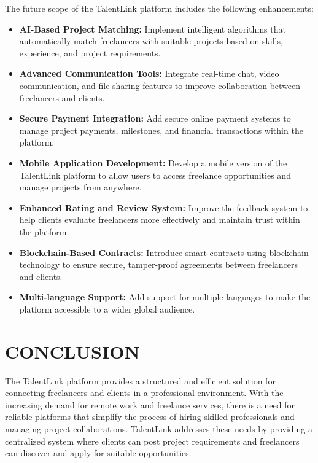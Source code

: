 \documentclass[12pt,a4paper,oneside]{report}
\numberwithin{figure}{chapter}
\numberwithin{table}{chapter}
\begin{document}
\indent The future scope of the TalentLink platform includes the following enhancements:

\begin{itemize}[leftmargin=2em]
  \item \textbf{AI-Based Project Matching:} Implement intelligent algorithms that
        automatically match freelancers with suitable projects based on skills,
        experience, and project requirements.
  \item \textbf{Advanced Communication Tools:} Integrate real-time chat, video
        communication, and file sharing features to improve collaboration between
        freelancers and clients.
  \item \textbf{Secure Payment Integration:} Add secure online payment systems to manage
        project payments, milestones, and financial transactions within the platform.
  \item \textbf{Mobile Application Development:} Develop a mobile version of the
        TalentLink platform to allow users to access freelance opportunities and manage
        projects from anywhere.
  \item \textbf{Enhanced Rating and Review System:} Improve the feedback system to help
        clients evaluate freelancers more effectively and maintain trust within the
        platform.
  \item \textbf{Blockchain-Based Contracts:} Introduce smart contracts using blockchain
        technology to ensure secure, tamper-proof agreements between freelancers and
        clients.
  \item \textbf{Multi-language Support:} Add support for multiple languages to make the
        platform accessible to a wider global audience.
\end{itemize}

\chapter{CONCLUSION}

The TalentLink platform provides a structured and efficient solution for connecting
freelancers and clients in a professional environment. With the increasing demand for
remote work and freelance services, there is a need for reliable platforms that simplify
the process of hiring skilled professionals and managing project collaborations.
TalentLink addresses these needs by providing a centralized system where clients can post
project requirements and freelancers can discover and apply for suitable opportunities.
\end{document}
